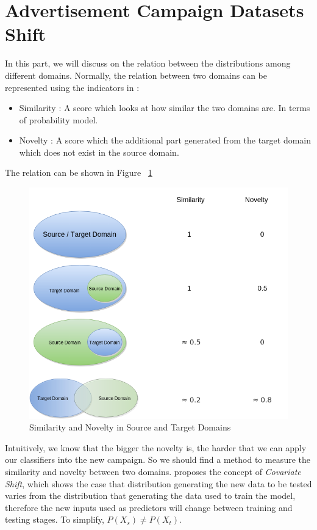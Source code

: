\section{Advertisement Campaign Datasets Shift}
In this part, we will discuss on the relation between the distributions among different domains. Normally, the relation between two domains can be represented using the indicators in 
\cite{shen2015effective}:
\begin{itemize}
\item Similarity : A score which looks at how similar
the two domains are. In terms of probability model.
\item Novelty : A score which the additional part generated from the target domain which does not exist in the source domain.
\end{itemize}
The relation can be shown in Figure ~\ref{fig:crossdomain}
\begin{figure}[h]
\centering
\includegraphics[width=\columnwidth]{crossdomain.png}
\caption{Similarity and Novelty in Source and Target Domains}
\label{fig:crossdomain}
\end{figure}
Intuitively, we know that the bigger the novelty is, the harder that we can apply our classifiers into the new campaign. So we should find a method to measure the similarity and novelty between two domains. 
\cite{bickel2009discriminative} proposes the concept of \textit{Covariate Shift}, which shows the case that distribution generating the new data to be tested varies from the distribution that generating the data used to train the model, therefore the new inputs used as predictors will change between training and testing stages. To simplify, \(P(X_s) \neq P(X_t)\).

